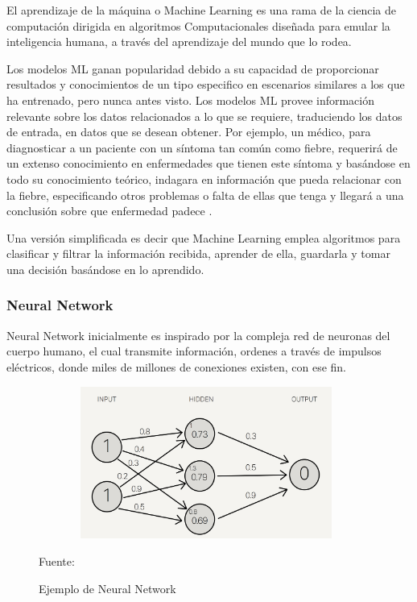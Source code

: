 El aprendizaje de la máquina o Machine Learning es una rama de la ciencia de computación dirigida en algoritmos Computacionales diseñada para emular la inteligencia humana, a través del aprendizaje del mundo que lo rodea.

Los modelos ML ganan popularidad debido a su capacidad de proporcionar resultados y conocimientos de un tipo especifico en escenarios similares a los que ha entrenado, pero nunca antes visto. Los modelos ML provee información relevante sobre los datos relacionados a lo que se requiere, traduciendo los datos de entrada, en datos que se desean obtener. Por ejemplo, un médico, para diagnosticar a un paciente con un síntoma tan común como fiebre, requerirá de un extenso conocimiento en enfermedades que tienen este síntoma y basándose en todo su conocimiento teórico, indagara en información que pueda relacionar con la fiebre, especificando otros problemas o falta de ellas que tenga y llegará a una conclusión sobre que enfermedad padece \cite{murdoch2019interpretable}.

Una versión simplificada es decir que Machine Learning emplea algoritmos para clasificar y filtrar la información recibida, aprender de ella, guardarla y tomar una decisión basándose en lo aprendido. 

\subsubsection{Neural Network}

Neural Network inicialmente es inspirado por la compleja red de neuronas del cuerpo humano, el cual transmite información, ordenes a través de impulsos eléctricos, donde miles de millones de conexiones existen, con ese fin\cite{wang2003artificial}. 
\\
\begin{figure}[t!]
	\centering
	\includegraphics[width=11cm,height=5cm,]{./Images/neuralnetwork.png}
	\caption{Ejemplo de Neural Network}
	\footnotesize Fuente:\cite{8765346}
	\label{neuralnetwork}
\end{figure}

